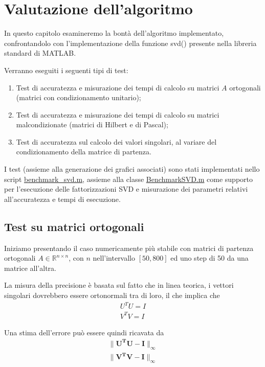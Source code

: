 \chapter{Valutazione dell'algoritmo}
In questo capitolo esamineremo la bontà dell'algoritmo implementato, 
confrontandolo con l'implementazione della funzione svd() presente nella 
libreria standard di MATLAB.

Verranno eseguiti i seguenti tipi di test:

\begin{enumerate}
	\item Test di accuratezza e misurazione dei tempi di calcolo su matrici $A$ 
ortogonali (matrici con condizionamento unitario);
	
	\item Test di accuratezza e misurazione dei tempi di calcolo su matrici 
malcondizionate (matrici di Hilbert e di Pascal);
	
	\item Test di accuratezza sul calcolo dei valori singolari, al variare del 
condizionamento della matrice di partenza.
\end{enumerate}

I test (assieme alla generazione dei grafici associati) sono stati implementati 
nello script 
\href{https://github.com/Yagotzirck/svd_benchmark/blob/main/src/benchmark_svd.m}{benchmark\_svd.m}, 
assieme alla classe 
\href{https://github.com/Yagotzirck/svd_benchmark/blob/main/src/BenchmarkSVD.m}{BenchmarkSVD.m} 
come supporto per l'esecuzione delle fattorizzazioni SVD e misurazione dei 
parametri relativi all'accuratezza e tempi di esecuzione.

\newpage
\section{Test su matrici ortogonali}
Iniziamo presentando il caso numericamente più stabile con matrici di partenza 
ortogonali $A \in \mathbb{R}^{n \times n}$, con $n$ nell'intervallo $[50, 800]$ 
ed uno step di 50 da una matrice all'altra.

La misura della precisione è basata sul fatto che in linea teorica, i vettori 
singolari dovrebbero essere ortonormali tra di loro, il che implica che
\begin{gather*}
	U^T U = I \\
	V^T V = I
\end{gather*}

Una stima dell'errore può essere quindi ricavata da
\begin{gather*}
	\| \mathbf{U^T U - I} \|_\infty \\
	\| \mathbf{V^T V - I} \|_\infty
\end{gather*}

